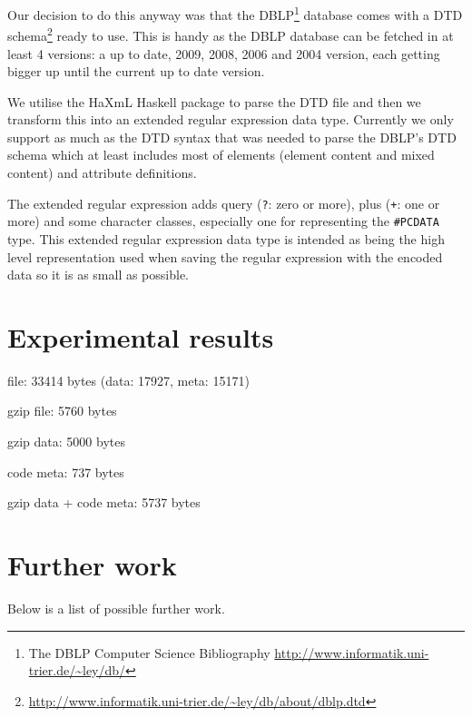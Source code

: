 \documentclass[a4paper, oneside]{memoir}
\theoremstyle{definition}
\begin{document}
Our decision to do this anyway was that the DBLP\footnote{The DBLP Computer
  Science Bibliography \url{http://www.informatik.uni-trier.de/~ley/db/}}
database comes with a DTD
schema\footnote{\url{http://www.informatik.uni-trier.de/~ley/db/about/dblp.dtd}}
ready to use. This is handy as the DBLP database can be fetched in at least 4
versions: a up to date, 2009, 2008, 2006 and 2004 version, each getting bigger
up until the current up to date version.

We utilise the HaXmL Haskell package to parse the DTD file and then we transform
this into an extended regular expression data type. Currently we only support as
much as the DTD syntax that was needed to parse the DBLP's DTD schema which at
least includes most of elements (element content and mixed content) and
attribute definitions.

The extended regular expression adds query (\texttt{?}: zero or more), plus
(\texttt{+}: one or more) and some character classes, especially one for
representing the \texttt{\#PCDATA} type. This extended regular expression data
type is intended as being the high level representation used when saving the
regular expression with the encoded data so it is as small as possible.


\chapter{Experimental results}
\label{sec:experimental_results}

file: 33414 bytes (data: 17927, meta: 15171)

gzip file: 5760 bytes

gzip data: 5000 bytes

code meta: 737 bytes

gzip data + code meta: 5737 bytes

\chapter{Further work}

Below is a list of possible further work.
\end{document}
